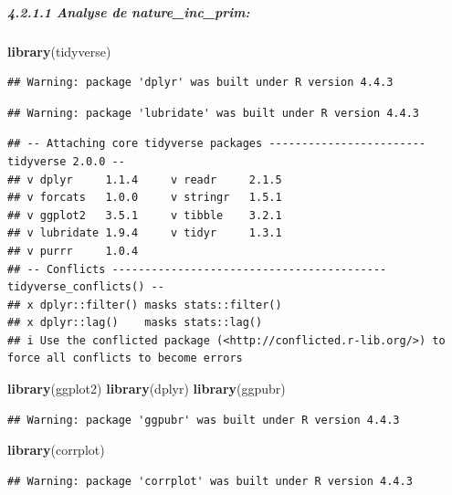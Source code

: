 \documentclass[
]{article}
\newenvironment{Shaded}{\begin{snugshade}}{\end{snugshade}}
\newcommand{\FunctionTok}[1]{\textcolor[rgb]{0.13,0.29,0.53}{\textbf{#1}}}
\newcommand{\NormalTok}[1]{#1}
\begin{document}
\subparagraph{4.2.1.1 Analyse de
nature\_inc\_prim:}\label{analyse-de-nature_inc_prim}

\begin{Shaded}
\begin{Highlighting}[]
\FunctionTok{library}\NormalTok{(tidyverse)}
\end{Highlighting}
\end{Shaded}

\begin{verbatim}
## Warning: package 'dplyr' was built under R version 4.4.3
\end{verbatim}

\begin{verbatim}
## Warning: package 'lubridate' was built under R version 4.4.3
\end{verbatim}

\begin{verbatim}
## -- Attaching core tidyverse packages ------------------------ tidyverse 2.0.0 --
## v dplyr     1.1.4     v readr     2.1.5
## v forcats   1.0.0     v stringr   1.5.1
## v ggplot2   3.5.1     v tibble    3.2.1
## v lubridate 1.9.4     v tidyr     1.3.1
## v purrr     1.0.4     
## -- Conflicts ------------------------------------------ tidyverse_conflicts() --
## x dplyr::filter() masks stats::filter()
## x dplyr::lag()    masks stats::lag()
## i Use the conflicted package (<http://conflicted.r-lib.org/>) to force all conflicts to become errors
\end{verbatim}

\begin{Shaded}
\begin{Highlighting}[]
\FunctionTok{library}\NormalTok{(ggplot2)}
\FunctionTok{library}\NormalTok{(dplyr)}
\FunctionTok{library}\NormalTok{(ggpubr)}
\end{Highlighting}
\end{Shaded}

\begin{verbatim}
## Warning: package 'ggpubr' was built under R version 4.4.3
\end{verbatim}

\begin{Shaded}
\begin{Highlighting}[]
\FunctionTok{library}\NormalTok{(corrplot)}
\end{Highlighting}
\end{Shaded}

\begin{verbatim}
## Warning: package 'corrplot' was built under R version 4.4.3
\end{verbatim}
\end{document}
